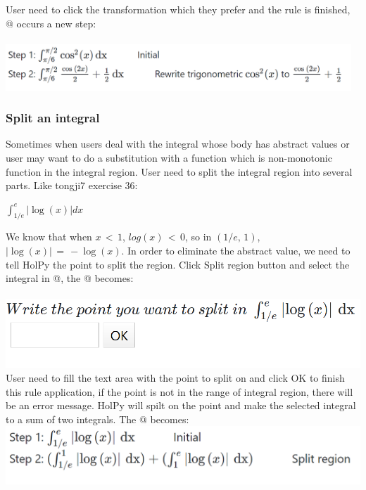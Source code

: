 \documentclass[titlepage]{article}
\makeatletter
\newcommand*{\rom}[1]{\expandafter\@slowromancap\romannumeral #1@}
\makeatother
\begin{document}
User need to click the transformation which they prefer and the rule is finished, \rom{3} occurs a new step:\\\\
\includegraphics[width=13cm]{32.png}\\
\subsubsection{Split an integral}
Sometimes when users deal with the integral whose body has abstract values or user may want to do a substitution with a function which is non-monotonic function in the integral region. User need to split the integral region into several parts. Like tongji7 exercise 36:
\begin{center}
$\int_{1/e}^{e} \left| \log{(x)} \right| dx$
\end{center}
We know that when $x\,<\,1$, $log(x)\,<\,0$, so in $(1/e,\,1)$, $\left| \log{(x)} \right|\,=\,-\log{(x)}$. In order to eliminate the abstract value, we need to tell HolPy the point to split the region. Click \colorbox{mygray}{Split region} button and select the integral in \rom{4}, the \rom{5} becomes:\\\\
\includegraphics{25.png}\\
User need to fill the text area with the point to split on and click \colorbox{mygray}{OK} to finish this rule application, if the point is not in the range of integral region, there will be an error message. HolPy will spilt on the point and make the selected integral to a sum of two integrals. The \rom{3} becomes:\\
\includegraphics[width=14.5cm]{26.png}\\
\end{document}
